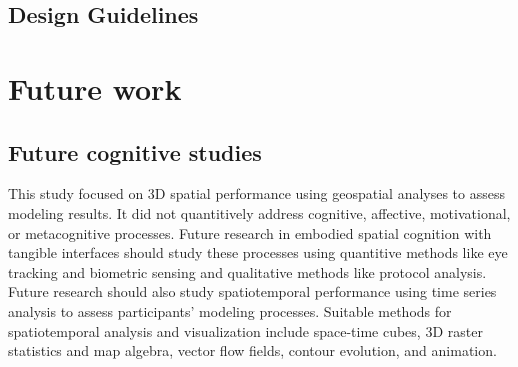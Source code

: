 \documentclass[prodmode,acmtochi]{acmsmall} %
\begin{document}



\subsection{Design Guidelines}

% 
%














\section{Future work}
%
\subsection{Future cognitive studies}
%
This study focused on 3D spatial performance
using geospatial analyses to assess modeling results. 
%
It did not quantitively address 
cognitive, affective, motivational, or metacognitive processes. 
%
Future research in embodied spatial cognition with tangible interfaces 
should study these processes using quantitive methods like 
eye tracking and biometric sensing 
and qualitative methods like protocol analysis.  
%
Future research should also study spatiotemporal performance
using time series analysis to assess participants' modeling processes.
%
Suitable methods for spatiotemporal analysis and visualization include 
space-time cubes, 3D raster statistics and map algebra, 
vector flow fields, contour evolution, and animation.
\end{document}
